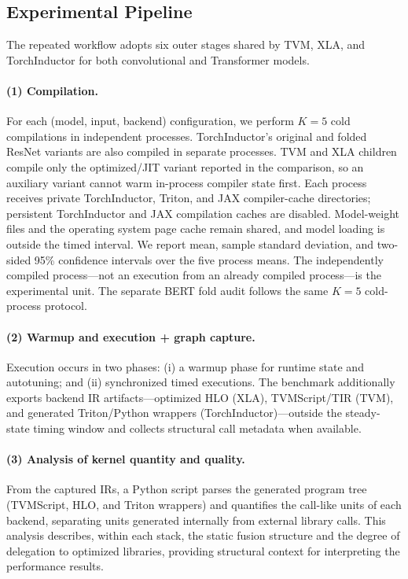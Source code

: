 \documentclass[sigconf]{acmart}
\begin{document}
\subsection{Experimental Pipeline}
The repeated workflow adopts six outer stages shared by TVM, XLA, and TorchInductor for both convolutional and Transformer models.

\paragraph{(1) Compilation.}
For each (model, input, backend) configuration, we perform \(K=5\) cold compilations in independent processes. TorchInductor's original and folded ResNet variants are also compiled in separate processes. TVM and XLA children compile only the optimized/JIT variant reported in the comparison, so an auxiliary variant cannot warm in-process compiler state first. Each process receives private TorchInductor, Triton, and JAX compiler-cache directories; persistent TorchInductor and JAX compilation caches are disabled. Model-weight files and the operating system page cache remain shared, and model loading is outside the timed interval. We report mean, sample standard deviation, and two-sided 95\% confidence intervals over the five process means. The independently compiled process---not an execution from an already compiled process---is the experimental unit. The separate BERT fold audit follows the same \(K=5\) cold-process protocol.

\paragraph{(2) Warmup and execution + graph capture.}
Execution occurs in two phases: (i) a warmup phase for runtime state and autotuning; and (ii) synchronized timed executions. The benchmark additionally exports backend IR artifacts---optimized HLO (XLA), TVMScript/TIR (TVM), and generated Triton/Python wrappers (TorchInductor)---outside the steady-state timing window and collects structural call metadata when available.

\paragraph{(3) Analysis of kernel quantity and quality.}
From the captured IRs, a Python script parses the generated program tree (TVMScript, HLO, and Triton wrappers) and quantifies the call-like units of each backend, separating units generated internally from external library calls. This analysis describes, within each stack, the static fusion structure and the degree of delegation to optimized libraries, providing structural context for interpreting the performance results.
\end{document}
